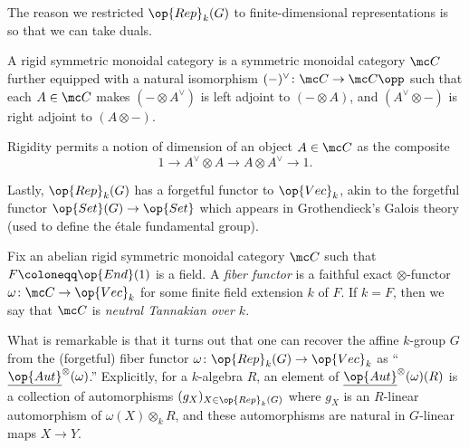 \documentclass{article}
\begin{document}
The reason we restricted $\op{Rep}_k(G)$ to finite-dimensional representations is so that we can take duals.
\begin{definition}[rigid]
	A rigid symmetric monoidal category is a symmetric monoidal category $\mc C$ further equipped with a natural isomorphism $(-)^\lor\colon\mc C\to\mc C\opp$ such that each $A\in\mc C$ makes $(-\otimes A^\lor)$ is left adjoint to $(-\otimes A)$, and $(A^\lor\otimes-)$ is right adjoint to $(A\otimes-)$.
\end{definition}
\begin{remark}
	Rigidity permits a notion of dimension of an object $A\in\mc C$ as the composite
	\[1\to A^\lor\otimes A\to A\otimes A^\lor\to1.\]
\end{remark}
Lastly, $\op{Rep}_k(G)$ has a forgetful functor to $\op{Vec}_k$, akin to the forgetful functor $\op{Set}(G)\to\op{Set}$ which appears in Grothendieck's Galois theory (used to define the \'etale fundamental group).
\begin{definition}
	Fix an abelian rigid symmetric monoidal category $\mc C$ such that $F\coloneqq\op{End}(1)$ is a field. A \textit{fiber functor} is a faithful exact $\otimes$-functor $\omega\colon\mc C\to\op{Vec}_k$ for some finite field extension $k$ of $F$. If $k=F$, then we say that $\mc C$ is \textit{neutral Tannakian over $k$}.
\end{definition}
What is remarkable is that it turns out that one can recover the affine $k$-group $G$ from the (forgetful) fiber functor $\omega\colon\op{Rep}_k(G)\to\op{Vec}_k$ as ``$\underline{\op{Aut}}^\otimes(\omega)$.'' Explicitly, for a $k$-algebra $R$, an element of $\underline{\op{Aut}}^\otimes(\omega)(R)$ is a collection of automorphisms $(g_X)_{X\in\op{Rep}_k(G)}$ where $g_X$ is an $R$-linear automorphism of $\omega(X)\otimes_kR$, and these automorphisms are natural in $G$-linear maps $X\to Y$.
\end{document}
